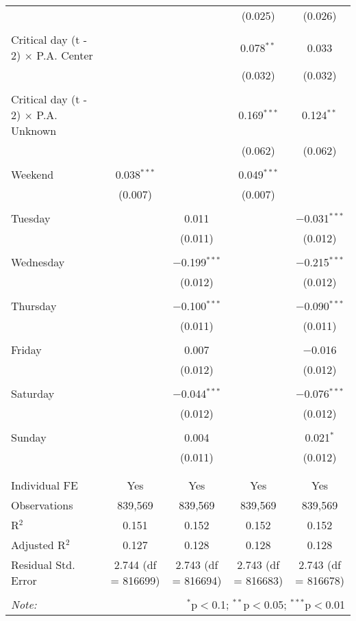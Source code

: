 \documentclass[
]{article}
\begin{document}
\begin{table}[!htbp]
{\begin{tabular}{@{\extracolsep{5pt}}lcccc}
  &  &  & (0.025) & (0.026) \\ 
  & & & & \\ 
 Critical day (t - 2) $\times$ P.A. Center &  &  & 0.078$^{**}$ & 0.033 \\ 
  &  &  & (0.032) & (0.032) \\ 
  & & & & \\ 
 Critical day (t - 2) $\times$ P.A. Unknown &  &  & 0.169$^{***}$ & 0.124$^{**}$ \\ 
  &  &  & (0.062) & (0.062) \\ 
  & & & & \\ 
 Weekend & 0.038$^{***}$ &  & 0.049$^{***}$ &  \\ 
  & (0.007) &  & (0.007) &  \\ 
  & & & & \\ 
 Tuesday &  & 0.011 &  & $-$0.031$^{***}$ \\ 
  &  & (0.011) &  & (0.012) \\ 
  & & & & \\ 
 Wednesday &  & $-$0.199$^{***}$ &  & $-$0.215$^{***}$ \\ 
  &  & (0.012) &  & (0.012) \\ 
  & & & & \\ 
 Thursday &  & $-$0.100$^{***}$ &  & $-$0.090$^{***}$ \\ 
  &  & (0.011) &  & (0.011) \\ 
  & & & & \\ 
 Friday &  & 0.007 &  & $-$0.016 \\ 
  &  & (0.012) &  & (0.012) \\ 
  & & & & \\ 
 Saturday &  & $-$0.044$^{***}$ &  & $-$0.076$^{***}$ \\ 
  &  & (0.012) &  & (0.012) \\ 
  & & & & \\ 
 Sunday &  & 0.004 &  & 0.021$^{*}$ \\ 
  &  & (0.011) &  & (0.012) \\ 
  & & & & \\ 
\hline \\[-1.8ex] 
Individual FE & Yes & Yes & Yes & Yes \\ 
Observations & 839,569 & 839,569 & 839,569 & 839,569 \\ 
R$^{2}$ & 0.151 & 0.152 & 0.152 & 0.152 \\ 
Adjusted R$^{2}$ & 0.127 & 0.128 & 0.128 & 0.128 \\ 
Residual Std. Error & 2.744 (df = 816699) & 2.743 (df = 816694) & 2.743 (df = 816683) & 2.743 (df = 816678) \\ 
\hline 
\hline \\[-1.8ex] 
\textit{Note:}  & \multicolumn{4}{r}{$^{*}$p$<$0.1; $^{**}$p$<$0.05; $^{***}$p$<$0.01} \\ 
\end{tabular}
} 
\end{table}
\end{document}
